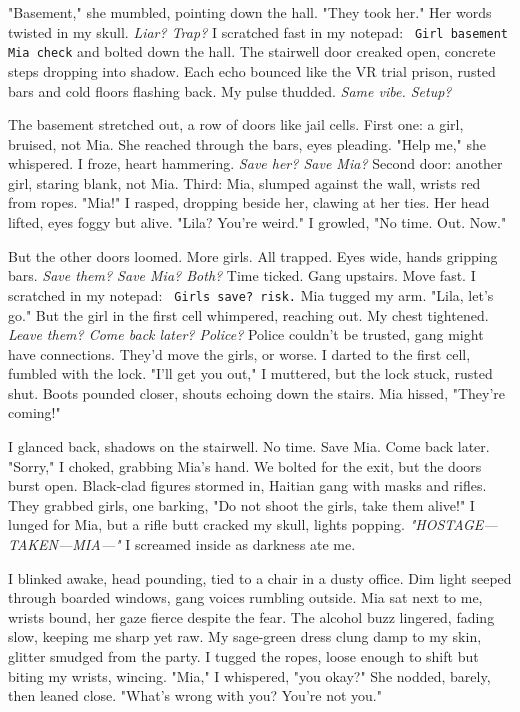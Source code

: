 \documentclass[12pt]{article}
\newcommand{\note}[1]{\texttt{\small \color{DarkGray} #1}}
\begin{document}
"Basement," she mumbled, pointing down the hall. "They took her." Her words twisted in my skull. \textit{Liar? Trap?} I scratched fast in my notepad: \note{Girl basement Mia check} and bolted down the hall. The stairwell door creaked open, concrete steps dropping into shadow. Each echo bounced like the VR trial prison, rusted bars and cold floors flashing back. My pulse thudded. \textit{Same vibe. Setup?}

The basement stretched out, a row of doors like jail cells. First one: a girl, bruised, not \textnormal{Mia}. She reached through the bars, eyes pleading. "Help me," she whispered. I froze, heart hammering. \textit{Save her? Save \textnormal{Mia}?} Second door: another girl, staring blank, not \textnormal{Mia}. Third: \textnormal{Mia}, slumped against the wall, wrists red from ropes. "\textnormal{Mia}!" I rasped, dropping beside her, clawing at her ties. Her head lifted, eyes foggy but alive. "\textnormal{Lila}? You’re weird." I growled, "No time. Out. Now."

But the other doors loomed. More girls. All trapped. Eyes wide, hands gripping bars. \textit{Save them? Save \textnormal{Mia}? Both?} Time ticked. Gang upstairs. Move fast. I scratched in my notepad: \note{Girls save? risk.} \textnormal{Mia} tugged my arm. "\textnormal{Lila}, let’s go." But the girl in the first cell whimpered, reaching out. My chest tightened. \textit{Leave them? Come back later? Police?} Police couldn’t be trusted, gang might have connections. They’d move the girls, or worse. I darted to the first cell, fumbled with the lock. "I’ll get you out," I muttered, but the lock stuck, rusted shut. Boots pounded closer, shouts echoing down the stairs. \textnormal{Mia} hissed, "They’re coming!"

I glanced back, shadows on the stairwell. No time. Save \textnormal{Mia}. Come back later. "Sorry," I choked, grabbing \textnormal{Mia}’s hand. We bolted for the exit, but the doors burst open. Black-clad figures stormed in, Haitian gang with masks and rifles. They grabbed girls, one barking, "Do not shoot the girls, take them alive!" I lunged for \textnormal{Mia}, but a rifle butt cracked my skull, lights popping. \textit{"HOSTAGE—TAKEN—MIA—"} I screamed inside as darkness ate me.

I blinked awake, head pounding, tied to a chair in a dusty office. Dim light seeped through boarded windows, gang voices rumbling outside. \textnormal{Mia} sat next to me, wrists bound, her gaze fierce despite the fear. The alcohol buzz lingered, fading slow, keeping me sharp yet raw. My sage-green dress clung damp to my skin, glitter smudged from the party. I tugged the ropes, loose enough to shift but biting my wrists, wincing. "\textnormal{Mia}," I whispered, "you okay?" She nodded, barely, then leaned close. "What’s wrong with you? You’re not you."
\end{document}
